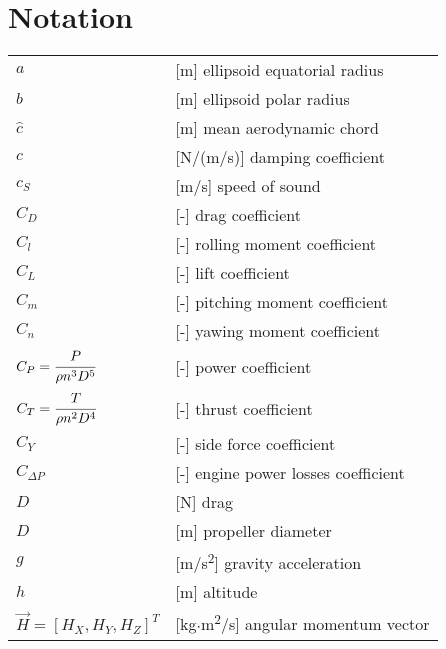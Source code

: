 \clearpage %
{}
\chapter*{Notation}
\markright{}

\begin{longtable}[l]{ l p{} }
  $a$                                          & [m] ellipsoid equatorial radius \\
  $b$                                          & [m] ellipsoid polar radius \\
  $\hat c$                                     & [m] mean aerodynamic chord \\
  $c$                                          & [N/(m/s)] damping coefficient \\
  $c_S$                                        & [m/s] speed of sound \\
  $C_D$                                        & [-] drag coefficient \\
  $C_l$                                        & [-] rolling moment coefficient \\
  $C_L$                                        & [-] lift coefficient \\
  $C_m$                                        & [-] pitching moment coefficient \\
  $C_n$                                        & [-] yawing moment coefficient \\
  $C_P=\cfrac{P}{\rho n^3 D^5}$                & [-] power coefficient \\
  $C_T=\cfrac{T}{\rho n^2 D^4}$                & [-] thrust coefficient \\
  $C_Y$                                        & [-] side force coefficient \\
  $C_{\Delta P}$                               & [-] engine power losses coefficient \\
  $D$                                          & [N] drag \\
  $D$                                          & [m] propeller diameter \\
  $g$                                          & [m/s\textsuperscript{2}] gravity acceleration \\
  $h$                                          & [m] altitude \\
  $\vec H=\left[ H_X, H_Y, H_Z \right]^T$      & [kg$\cdot$m\textsuperscript{2}/s] angular momentum vector \\

\end{longtable}
